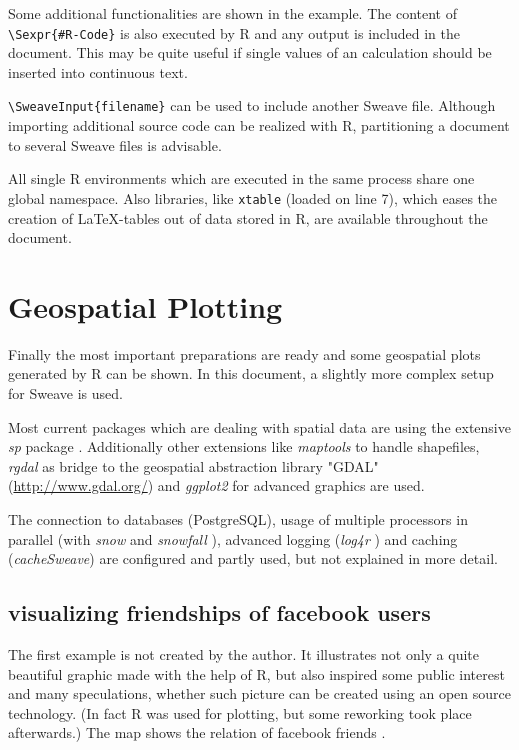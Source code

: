 \documentclass{ifacconf}
\begin{document}
Some additional functionalities are shown in the example. The content of
\texttt{\textbackslash{}Sexpr\{\#R-Code\}}
is also executed by R and any output is included in the document. This may be
quite useful if single values of an calculation should be inserted into 
continuous text.

\texttt{\textbackslash{}SweaveInput\{filename\}} can be used to include 
another Sweave file. Although importing additional source code can be realized with
R, partitioning a document to several Sweave files is advisable.

All single R environments which are executed in the same process share one
global namespace. Also libraries, like \texttt{xtable} (loaded on line 7), which eases the
creation of \LaTeX-tables out of data stored in R, are
available throughout the document.




\section{Geospatial Plotting}

Finally the most important preparations are ready and some geospatial plots 
generated by R can be shown. In this document, a slightly more complex
setup for Sweave is used. 

Most current packages which are dealing with spatial data are using the
extensive \textit{sp} package \citep{RSpatialDataAnalysis}. Additionally
other extensions like \textit{maptools} to handle shapefiles, \textit{rgdal}
as bridge to the geospatial abstraction library "GDAL" (\url{http://www.gdal.org/})
and \textit{ggplot2} \citep{Rggplot2} for advanced graphics are used.

The connection to databases (PostgreSQL), usage of multiple processors 
in parallel (with \textit{snow} and \textit{snowfall} \citep{Rsnow, Rsnowfall}), 
advanced logging (\textit{log4r} \citep{Rlog4r}) and caching (\textit{cacheSweave}) 
are configured and partly used, but not explained in more detail.

\subsection{visualizing friendships of facebook users}
The first example is not created by the author. It illustrates not only a
quite beautiful graphic made with the help of R, but also inspired some
public interest and many speculations, whether such picture can be
created using an open source technology. (In fact R was used for plotting,
but some reworking took place afterwards.) The map shows the relation of 
facebook friends \citep{FacebookFriendMap}.
\end{document}
